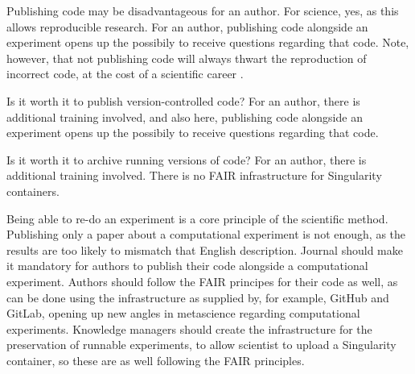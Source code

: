 
Publishing code may be disadvantageous for an author.
For science, yes, as this allows reproducible research.
For an author, publishing code alongside an experiment opens up
the possibily to receive questions regarding that code.
Note, however, that not publishing code will always thwart
the reproduction of incorrect code, at the cost of a scientific
career \cite{baggerly2009deriving}.


Is it worth it to publish version-controlled code?
For an author, 
there is additional training involved, and also here,
publishing code alongside an experiment opens up
the possibily to receive questions regarding that code.


Is it worth it to archive running versions of code?
For an author, 
there is additional training involved.
There is no FAIR infrastructure for Singularity containers.



Being able to re-do an experiment is a core principle of the scientific method.
Publishing only a paper about a computational experiment is not enough,
as the results are too likely to mismatch that English description.
Journal should make it mandatory for authors
to publish their code alongside a computational experiment.
Authors should follow the FAIR principes for their code as well,
as can be done using the infrastructure as supplied by, 
for example, GitHub and GitLab, opening up new angles in
metascience regarding computational experiments.
Knowledge managers should create the infrastructure for the preservation
of runnable experiments, to allow scientist to upload a Singularity
container, so these are as well following the FAIR principles.

